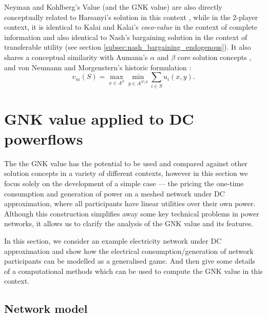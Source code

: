 Neyman and Kohlberg's Value (and the GNK value) are also directly conceptually related to Harsanyi's solution in this context \cite{values3},
while in the 2-player context, it is identical to Kalai and Kalai's \textit{coco-value} in the context of complete information \cite{kalai1,Kalai2010,value2} 
and also identical to Nash's bargaining solution in the context of transferable utility \cite{nash2,value2} (see section \ref{subsec:nash_bargaining_endogenous}).
It also shares a conceptual similarity with Aumann's $\alpha$ and $\beta$ core solution concepts \cite{aumann1961core}, and von Neumann and Morgenstern's historic formulation \cite{1944,KOHLBERG2018139,values3}:
\begin{equation}\label{knvalue3}v_m(S) = \max_{x\in A^S}\min_{y\in A^{N\setminus S}} \sum_{i\in S} u_i(x,y).\end{equation}


\section{GNK value applied to DC powerflows}\label{more_involved}

The the GNK value has the potential to be used and compared against other solution concepts in a variety of different contexts,
however in this section we focus solely on the development of a simple case --- the pricing the one-time consumption and generation of power on a meshed network under DC approximation, where all participants have linear utilities over their own power.
Although this construction simplifies away some key technical problems in power networks, it allows us to clarify the analysis of the GNK value and its features.

In this section, we consider an example electricity network under DC approximation and show how the electrical consumption/generation of network participants can be modelled as a generalised game. And then give some details of a computational methods which can be used to compute the GNK value in this context.

\subsection{Network model}\label{sec:the_setup}



